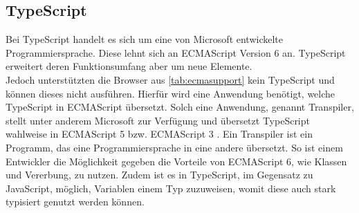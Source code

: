 \subsection{TypeScript}
Bei TypeScript handelt es sich um eine von Microsoft entwickelte Programmiersprache. Diese lehnt sich an ECMAScript Version 6 an. TypeScript erweitert deren Funktionsumfang aber um neue Elemente.\\ 
Jedoch unterstützten die Browser aus \autoref{tab:ecmasupport} kein TypeScript und können dieses nicht ausführen. Hierfür wird eine Anwendung benötigt, welche TypeScript in ECMAScript übersetzt. Solch eine Anwendung, genannt Transpiler, stellt unter anderem Microsoft zur Verfügung und übersetzt TypeScript wahlweise in ECMAScript 5 bzw. ECMAScript 3 \cite[S. 439 f.]{ste15}. Ein Transpiler ist ein Programm, das eine Programmiersprache in eine andere übersetzt. So ist einem Entwickler die Möglichkeit gegeben die Vorteile von ECMAScript 6, wie Klassen und Vererbung, zu nutzen. Zudem ist es in TypeScript, im Gegensatz zu JavaScript, möglich, Variablen einem Typ zuzuweisen, womit diese auch stark typisiert genutzt werden können.